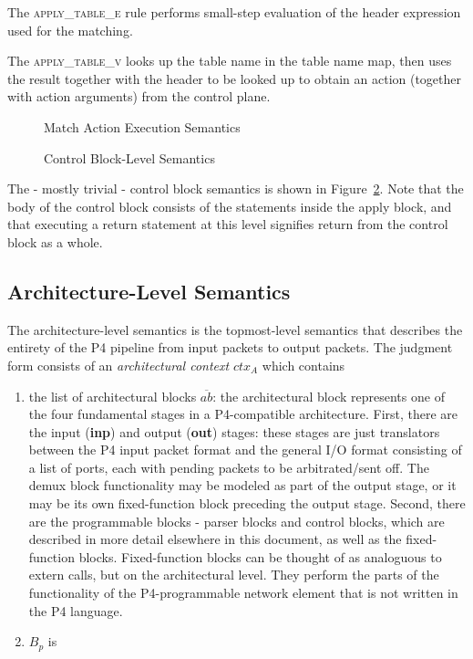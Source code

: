 \documentclass[UTF8]{article}
\begin{document}
The \textsc{apply\_table\_e} rule performs small-step evaluation of the header expression used for the matching.

The \textsc{apply\_table\_v} looks up the table name in the table name map, then uses the result together with the header to be looked up to obtain an action (together with action arguments) from the control plane.

\begin{figure}[ht!]
\ottusedrule{\ottdrulestmtXXapplyXXtableXXe{}}
\ottusedrule{\ottdrulestmtXXapplyXXtableXXv{}}
\caption{Match Action Execution Semantics}
\label{fig:semmatchaction}
\end{figure}

\begin{figure}[ht!]
\ottdefnsctrlXXsem
\caption{Control Block-Level Semantics}
\label{fig:semctrl}
\end{figure}

The - mostly trivial - control block semantics is shown in Figure~\ref{fig:semctrl}. Note that the body of the control block consists of the statements inside the apply block, and that executing a return statement at this level signifies return from the control block as a whole.

\newcommand{\actx}{\ensuremath{\mathit{ctx}_\mathit{A}}}
\newcommand{\abl}{\ensuremath{\overline{ab}}}
\subsection{Architecture-Level Semantics}

The architecture-level semantics is the topmost-level semantics that describes the entirety of the P4 pipeline from input packets to output packets. The judgment form consists of an \emph{architectural context} \actx{} which contains
\begin{enumerate}
\item the list of architectural blocks \abl{}: the architectural block represents one of the four fundamental stages in a P4-compatible architecture. First, there are the input (\textbf{inp}) and output (\textbf{out}) stages: these stages are just translators between the P4 input packet format and the general I/O format consisting of a list of ports, each with pending packets to be arbitrated/sent off. The demux block functionality may be modeled as part of the output stage, or it may be its own fixed-function block preceding the output stage. Second, there are the programmable blocks - parser blocks and control blocks, which are described in more detail elsewhere in this document, as well as the fixed-function blocks. Fixed-function blocks can be thought of as analoguous to extern calls, but on the architectural level. They perform the parts of the functionality of the P4-programmable network element that is not written in the P4 language.
\item $B_p$ is 
\end{enumerate}
\end{document}
